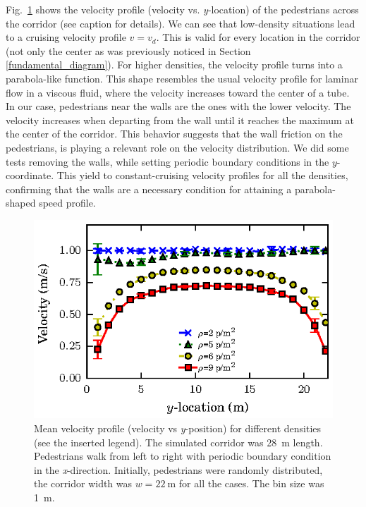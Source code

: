 Fig.~\ref{speed-profile-w22} shows the velocity profile (velocity vs. \textit{y}-location) of the pedestrians across the corridor (see caption for details). We can see that low-density situations lead to a cruising velocity profile $v=v_d$. This is valid for every location in the corridor (not only the center as was previously noticed in Section \ref{fundamental_diagram}). For higher densities, the velocity profile turns into a parabola-like function. This shape resembles the usual velocity profile for laminar flow in a viscous fluid, where the velocity increases toward the center of a tube. In our case, pedestrians near the walls are the ones with the lower velocity. The velocity increases when departing from the wall until it reaches the maximum at the center of the corridor. This behavior suggests that the wall friction on the pedestrians, is playing a relevant role on the velocity distribution. We did some tests removing the walls, while setting periodic boundary conditions in the $y$-coordinate. This yield to constant-cruising velocity profiles for all the densities, confirming that the walls are a necessary condition for attaining a parabola-shaped speed profile.\\

\begin{figure}[htbp!]
\includegraphics[width=\columnwidth]
{plots/v(y)_width22_k24.eps}
\caption{\label{speed-profile-w22} Mean velocity profile (velocity vs \textit{y}-position) for different densities (see the inserted legend). The simulated corridor was 28~m length. Pedestrians walk from left to right with periodic boundary condition in the \textit{x}-direction. Initially, pedestrians were randomly distributed, the corridor width was $w = 22~$m for all the cases. The bin size was 1~m.}
\end{figure}

